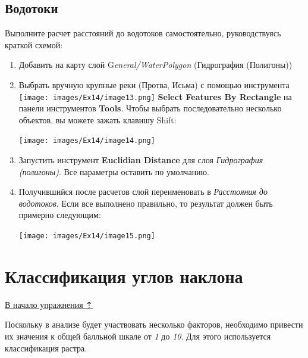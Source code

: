 \documentclass[12pt,]{book}
\begin{document}
\hypertarget{weighted-overlay-streams}{%
\subsection{Водотоки}\label{weighted-overlay-streams}}

Выполните расчет расстояний до водотоков самостоятельно, руководствуясь краткой схемой:

\begin{enumerate}
\def\labelenumi{\arabic{enumi}.}
\item
  Добавить на карту слой G\emph{eneral/WaterPolygon} (Гидрография (Полигоны))
\item
  Выбрать вручную крупные реки (Протва, Исьма) с помощью инструмента \texttt{[image: images/Ex14/image13.png]} \textbf{Select Features By Rectangle} на панели инструментов \textbf{Tools}. Чтобы выбрать последовательно несколько объектов, вы можете зажать клавишу Shift:

  \texttt{[image: images/Ex14/image14.png]}
\item
  Запустить инструмент \textbf{Euclidian Distance} для слоя \emph{Гидрография (полигоны)}. Все параметры оставить по умолчанию.
\item
  Получившийся после расчетов слой переименовать в \emph{Расстояния до водотоков}. Если все выполнено правильно, то результат должен быть примерно следующим:

  \texttt{[image: images/Ex14/image15.png]}
\end{enumerate}

\hypertarget{weighted-overlay-slope-classes}{%
\section{Классификация углов наклона}\label{weighted-overlay-slope-classes}}

\protect\hyperlink{weighted-overlay}{В начало упражнения ⇡}

Поскольку в анализе будет участвовать несколько факторов, необходимо привести их значения к общей балльной шкале от \emph{1} до \emph{10}. Для этого используется классификация растра.
\end{document}
